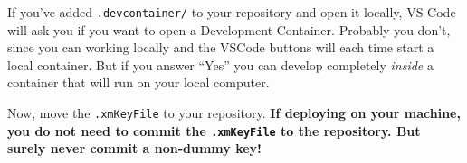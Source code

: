 \documentclass{ximera}
\begin{document}
\begin{warning}
    If you've added \verb!.devcontainer/! to your repository and open it
    locally, VS Code will ask you if you want to open a Development Container.
    Probably you don't, since you can working locally and the VSCode buttons will each time start a local container.
    But if you answer ``Yes'' you can develop completely \textit{inside} a container that will run on your local computer. 
\end{warning}

Now, move the \verb!.xmKeyFile! to your repository.
\textbf{If deploying on your machine, you do not need to commit the
    \texttt{.xmKeyFile} to the repository. But surely never commit a non-dummy key!}
\end{document}
